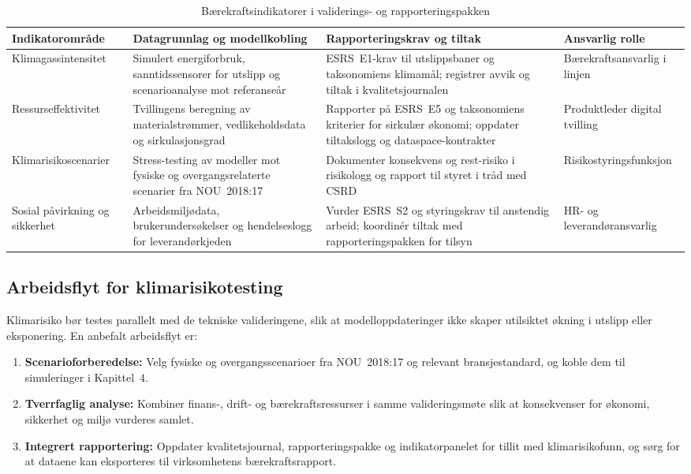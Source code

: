 \begin{table}[htbp]
    \centering
    \caption{Bærekraftsindikatorer i validerings- og rapporteringspakken}
    \label{tab:baerekraft-validering}
    \begin{tabular}{|p{3.2cm}|p{4.5cm}|p{4.5cm}|p{3.0cm}|}
        \hline
        \textbf{Indikatorområde} & \textbf{Datagrunnlag og modellkobling} & \textbf{Rapporteringskrav og tiltak} & \textbf{Ansvarlig rolle} \\
        \hline
        Klimagassintensitet & Simulert energiforbruk, sanntidssensorer for utslipp og scenarioanalyse mot referanseår & ESRS~E1-krav til utslippsbaner og taksonomiens klimamål; registrer avvik og tiltak i kvalitetsjournalen & Bærekraftsansvarlig i linjen \\
        \hline
        Ressurseffektivitet & Tvillingens beregning av materialstrømmer, vedlikeholdsdata og sirkulasjonsgrad & Rapporter på ESRS~E5 og taksonomiens kriterier for sirkulær økonomi; oppdater tiltakslogg og dataspace-kontrakter & Produktleder digital tvilling \\
        \hline
        Klimarisikoscenarier & Stress-testing av modeller mot fysiske og overgangsrelaterte scenarier fra NOU~2018:17 \citep{nou2018klimarisiko} & Dokumenter konsekvens og rest-risiko i risikologg og rapport til styret i tråd med CSRD & Risikostyringsfunksjon \\
        \hline
        Sosial påvirkning og sikkerhet & Arbeidsmiljødata, brukerundersøkelser og hendelseslogg for leverandørkjeden & Vurder ESRS~S2 og styringskrav til anstendig arbeid; koordinér tiltak med rapporteringspakken for tilsyn & HR- og leverandøransvarlig \\
        \hline
    \end{tabular}
\end{table}

\subsection{Arbeidsflyt for klimarisikotesting}
Klimarisiko bør testes parallelt med de tekniske valideringene, slik at modelloppdateringer ikke skaper utilsiktet økning i utslipp eller eksponering. En anbefalt arbeidsflyt er:
\begin{enumerate}
    \item \textbf{Scenarioforberedelse:} Velg fysiske og overgangsscenarioer fra NOU~2018:17 og relevant bransjestandard, og koble dem til simuleringer i Kapittel~4.
    \item \textbf{Tverrfaglig analyse:} Kombiner finans-, drift- og bærekraftsressurser i samme valideringsmøte slik at konsekvenser for økonomi, sikkerhet og miljø vurderes samlet.
    \item \textbf{Integrert rapportering:} Oppdater kvalitetsjournal, rapporteringspakke og indikatorpanelet for tillit med klimarisikofunn, og sørg for at dataene kan eksporteres til virksomhetens bærekraftsrapport.
\end{enumerate}

